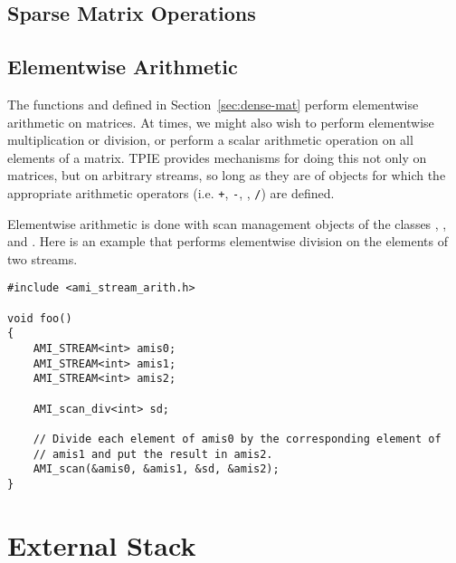 
\subsection{Sparse Matrix Operations}


\tobewritten


\subsection{Elementwise Arithmetic}

The functions 
and  defined in
Section~\ref{sec:dense-mat} perform elementwise arithmetic on
matrices.  At times, we might also wish to perform elementwise
multiplication or division, or perform a scalar arithmetic operation
on all elements of a matrix.  TPIE provides mechanisms for doing this
not only on matrices, but on arbitrary streams, so long as they are of
objects for which the appropriate arithmetic operators (i.e. {\tt +},
{\tt -}, {\tt *}, {\tt /}) are defined.

Elementwise arithmetic is done with scan management objects
 of the classes
, ,  and
.  Here is an example that performs
elementwise division on the elements of two streams.

\begin{verbatim}
#include <ami_stream_arith.h>

void foo()
{
    AMI_STREAM<int> amis0;
    AMI_STREAM<int> amis1;
    AMI_STREAM<int> amis2;

    AMI_scan_div<int> sd;

    // Divide each element of amis0 by the corresponding element of
    // amis1 and put the result in amis2.
    AMI_scan(&amis0, &amis1, &sd, &amis2);
}
\end{verbatim}



\section{External Stack}

